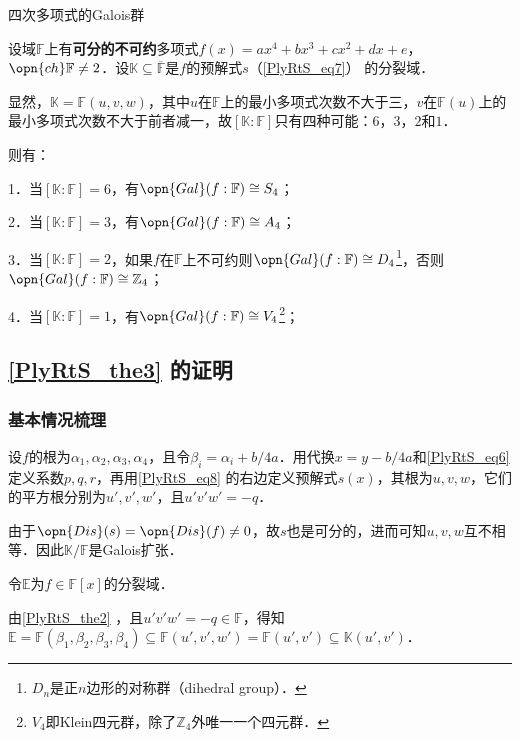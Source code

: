 \begin{theorem}{四次多项式的Galois群}\label{PlyRtS_the3}

设域$\mathbb{F}$上有\textbf{可分的不可约}多项式$f(x)=ax^4+bx^3+cx^2+dx+e$，$\opn{ch}\mathbb{F}\neq 2$．设$\mathbb{K}\subseteq\overline{\mathbb{F}}$是$f$的预解式$s$（\autoref{PlyRtS_eq7}） 的分裂域．

显然，$\mathbb{K}=\mathbb{F}(u, v, w)$，其中$u$在$\mathbb{F}$上的最小多项式次数不大于三，$v$在$\mathbb{F}(u)$上的最小多项式次数不大于前者减一，故$[\mathbb{K}:\mathbb{F}]$只有四种可能：$6$，$3$，$2$和$1$．

则有：

1．当$[\mathbb{K}:\mathbb{F}]=6$，有$\opn{Gal}(f:\mathbb{F})\cong S_4$；

2．当$[\mathbb{K}:\mathbb{F}]=3$，有$\opn{Gal}(f:\mathbb{F})\cong A_4$；

3．当$[\mathbb{K}:\mathbb{F}]=2$，如果$f$在$\mathbb{F}$上不可约则$\opn{Gal}(f:\mathbb{F})\cong D_4$\footnote{$D_n$是正$n$边形的对称群（dihedral group）．}，否则$\opn{Gal}(f:\mathbb{F})\cong \mathbb{Z}_4$；

4．当$[\mathbb{K}:\mathbb{F}]=1$，有$\opn{Gal}(f:\mathbb{F})\cong V_4$\footnote{$V_4$即Klein四元群，除了$\mathbb{Z}_4$外唯一一个四元群．}；

\end{theorem}

\subsection{\autoref{PlyRtS_the3} 的证明}

\subsubsection{基本情况梳理}

设$f$的根为$\alpha_1, \alpha_2, \alpha_3, \alpha_4$，且令$\beta_i=\alpha_i+b/4a$．用代换$x=y-b/4a$和\autoref{PlyRtS_eq6} 定义系数$p, q, r$，再用\autoref{PlyRtS_eq8}  的右边定义预解式$s(x)$，其根为$u, v, w$，它们的平方根分别为$u', v', w'$，且$u'v'w'=-q$．

由于$\opn{Dis}(s)=\opn{Dis}(f)\neq 0$，故$s$也是可分的，进而可知$u, v, w$互不相等．因此$\mathbb{K}/\mathbb{F}$是Galois扩张．

令$\mathbb{E}$为$f\in\mathbb{F}[x]$的分裂域．

由\autoref{PlyRtS_the2} ，且$u'v'w'=-q\in\mathbb{F}$，得知$\mathbb{E}=\mathbb{F}(\beta_1, \beta_2, \beta_3, \beta_4)\subseteq\mathbb{F}(u', v', w')=\mathbb{F}(u', v')\subseteq\mathbb{K}(u', v')$．

